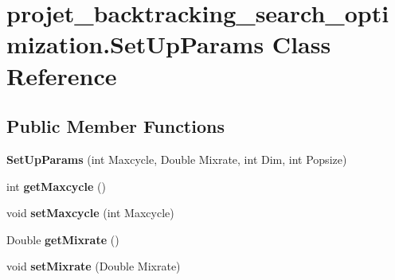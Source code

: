 \hypertarget{classprojet__backtracking__search__optimization_1_1_set_up_params}{}\section{projet\+\_\+backtracking\+\_\+search\+\_\+optimization.\+Set\+Up\+Params Class Reference}
\label{classprojet__backtracking__search__optimization_1_1_set_up_params}
\subsection*{Public Member Functions}
\begin{DoxyCompactItemize}
\item 
\mbox{\label{classprojet__backtracking__search__optimization_1_1_set_up_params_acb4a8ba3270957b5581adc18cd4cd630}} 
{\bfseries Set\+Up\+Params} (int Maxcycle, Double Mixrate, int Dim, int Popsize)
\item 
\mbox{\label{classprojet__backtracking__search__optimization_1_1_set_up_params_a497804731d440e6fa0209a5369879d48}} 
int {\bfseries get\+Maxcycle} ()
\item 
\mbox{\label{classprojet__backtracking__search__optimization_1_1_set_up_params_ae8d75db508b028df44585dbeeb6e7d95}} 
void {\bfseries set\+Maxcycle} (int Maxcycle)
\item 
\mbox{\label{classprojet__backtracking__search__optimization_1_1_set_up_params_a34cf3e0eed7f170ec6acaa7cec18ece2}} 
Double {\bfseries get\+Mixrate} ()
\item 
\mbox{\label{classprojet__backtracking__search__optimization_1_1_set_up_params_abb2a5fc20d67046a1656535dabf97beb}} 
void {\bfseries set\+Mixrate} (Double Mixrate)
\item 
\mbox{\label{classprojet__backtracking__search__optimization_1_1_set_up_params_a9e0fb85f420811f7cb990f17a52a1425}} 

\end{DoxyCompactItemize}
